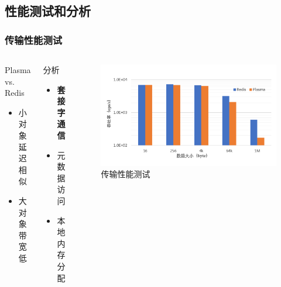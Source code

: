 \subsection*{性能测试和分析}
\begin{frame}
	\frametitle{传输性能测试}

	\begin{columns}[t]
		\begin{block}{Plasma vs. Redis}
			\begin{itemize}
				\item 小对象延迟相似
				\item 大对象带宽低
			\end{itemize}
		\end{block}
		\begin{block}{分析}
			\begin{itemize}
				\item \textbf{套接字通信}
				\item 元数据访问
				\item 本地内存分配
			\end{itemize}
		\end{block}
		\begin{figure}
			\centering
			\includegraphics[width=\textwidth]{image/chap02/fetch.png}
			\caption{传输性能测试}
		\end{figure}
	\end{columns}
\end{frame}